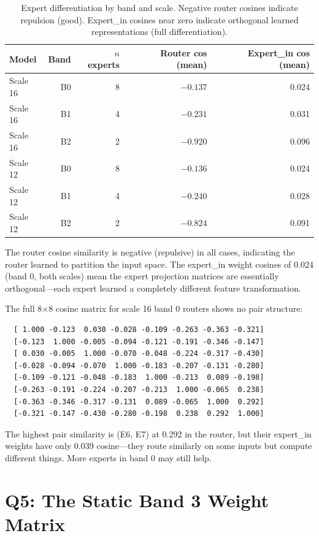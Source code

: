 \documentclass[11pt,a4paper]{report}
\begin{document}
\begin{table}[h]
\centering
\begin{tabular}{lrrrr}
\toprule
\textbf{Model} & \textbf{Band} & \textbf{$n$ experts} & \textbf{Router cos (mean)} & \textbf{Expert\_in cos (mean)} \\
\midrule
Scale 16 & B0 & 8 & $-0.137$ & 0.024 \\
Scale 16 & B1 & 4 & $-0.231$ & 0.031 \\
Scale 16 & B2 & 2 & $-0.920$ & 0.096 \\
\midrule
Scale 12 & B0 & 8 & $-0.136$ & 0.024 \\
Scale 12 & B1 & 4 & $-0.240$ & 0.028 \\
Scale 12 & B2 & 2 & $-0.824$ & 0.091 \\
\bottomrule
\end{tabular}
\caption{Expert differentiation by band and scale. Negative router cosines indicate repulsion (good). Expert\_in cosines near zero indicate orthogonal learned representations (full differentiation).}
\label{tab:expert_diff}
\end{table}

The router cosine similarity is negative (repulsive) in all cases, indicating the router learned to partition the input space. The expert\_in weight cosines of 0.024 (band 0, both scales) mean the expert projection matrices are essentially orthogonal---each expert learned a completely different feature transformation.

The full 8$\times$8 cosine matrix for scale 16 band 0 routers shows no pair structure:

\begin{verbatim}
  [ 1.000 -0.123  0.030 -0.028 -0.109 -0.263 -0.363 -0.321]
  [-0.123  1.000 -0.005 -0.094 -0.121 -0.191 -0.346 -0.147]
  [ 0.030 -0.005  1.000 -0.070 -0.048 -0.224 -0.317 -0.430]
  [-0.028 -0.094 -0.070  1.000 -0.183 -0.207 -0.131 -0.280]
  [-0.109 -0.121 -0.048 -0.183  1.000 -0.213  0.089 -0.198]
  [-0.263 -0.191 -0.224 -0.207 -0.213  1.000 -0.065  0.238]
  [-0.363 -0.346 -0.317 -0.131  0.089 -0.065  1.000  0.292]
  [-0.321 -0.147 -0.430 -0.280 -0.198  0.238  0.292  1.000]
\end{verbatim}

The highest pair similarity is (E6, E7) at 0.292 in the router, but their expert\_in weights have only 0.039 cosine---they route similarly on some inputs but compute different things. More experts in band 0 may still help.


\section{Q5: The Static Band 3 Weight Matrix}
\end{document}
